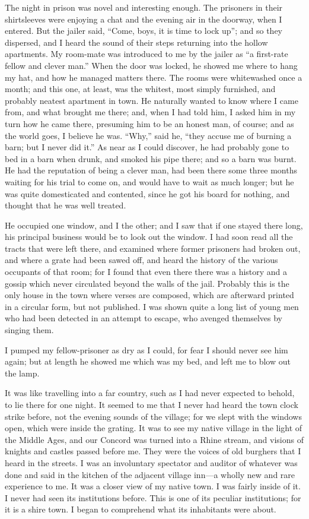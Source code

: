\documentclass[12pt]{article}
\begin{document}
The night in prison was novel and interesting enough. The prisoners in
their shirtsleeves were enjoying a chat and the evening air in the
doorway, when I entered. But the jailer said, ``Come, boys, it is time
to lock up''; and so they dispersed, and I heard the sound of their
steps returning into the hollow apartments. My room-mate was introduced
to me by the jailer as ``a first-rate fellow and clever man.'' When the
door was locked, he showed me where to hang my hat, and how he managed
matters there. The rooms were whitewashed once a month; and this one, at
least, was the whitest, most simply furnished, and probably neatest
apartment in town. He naturally wanted to know where I came from, and
what brought me there; and, when I had told him, I asked him in my turn
how he came there, presuming him to be an honest man, of course; and as
the world goes, I believe he was. ``Why,'' said he, ``they accuse me of
burning a barn; but I never did it.'' As near as I could discover, he
had probably gone to bed in a barn when drunk, and smoked his pipe
there; and so a barn was burnt. He had the reputation of being a clever
man, had been there some three months waiting for his trial to come on,
and would have to wait as much longer; but he was quite domesticated and
contented, since he got his board for nothing, and thought that he was
well treated.

He occupied one window, and I the other; and I saw that if one stayed
there long, his principal business would be to look out the window. I
had soon read all the tracts that were left there, and examined where
former prisoners had broken out, and where a grate had been sawed off,
and heard the history of the various occupants of that room; for I found
that even there there was a history and a gossip which never circulated
beyond the walls of the jail. Probably this is the only house in the
town where verses are composed, which are afterward printed in a
circular form, but not published. I was shown quite a long list of young
men who had been detected in an attempt to escape, who avenged
themselves by singing them.

I pumped my fellow-prisoner as dry as I could, for fear I should never
see him again; but at length he showed me which was my bed, and left me
to blow out the lamp.

It was like travelling into a far country, such as I had never expected
to behold, to lie there for one night. It seemed to me that I never had
heard the town clock strike before, not the evening sounds of the
village; for we slept with the windows open, which were inside the
grating. It was to see my native village in the light of the Middle
Ages, and our Concord was turned into a Rhine stream, and visions of
knights and castles passed before me. They were the voices of old
burghers that I heard in the streets. I was an involuntary spectator and
auditor of whatever was done and said in the kitchen of the adjacent
village inn---a wholly new and rare experience to me. It was a closer
view of my native town. I was fairly inside of it. I never had seen its
institutions before. This is one of its peculiar institutions; for it is
a shire town. I began to comprehend what its inhabitants were about.
\end{document}
